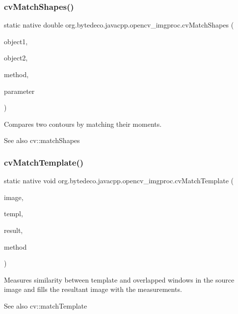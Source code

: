\subsubsection{\texorpdfstring{cv\+Match\+Shapes()}{cvMatchShapes()}}
{\footnotesize\ttfamily static native double org.\+bytedeco.\+javacpp.\+opencv\+\_\+imgproc.\+cv\+Match\+Shapes (\begin{DoxyParamCaption}\item[{@Const Pointer}]{object1,  }\item[{@Const Pointer}]{object2,  }\item[{int}]{method,  }\item[{double}]{parameter }\end{DoxyParamCaption})\hspace{0.3cm}{\ttfamily [static]}}



Compares two contours by matching their moments. 

\begin{DoxySeeAlso}{See also}
cv\+::match\+Shapes 
\end{DoxySeeAlso}
\mbox{\label{group__imgproc__c_ga6dda3f1745d471681378d2515509372a}} 
\subsubsection{\texorpdfstring{cv\+Match\+Template()}{cvMatchTemplate()}}
{\footnotesize\ttfamily static native void org.\+bytedeco.\+javacpp.\+opencv\+\_\+imgproc.\+cv\+Match\+Template (\begin{DoxyParamCaption}\item[{@Const Cv\+Arr}]{image,  }\item[{@Const Cv\+Arr}]{templ,  }\item[{Cv\+Arr}]{result,  }\item[{int}]{method }\end{DoxyParamCaption})\hspace{0.3cm}{\ttfamily [static]}}



Measures similarity between template and overlapped windows in the source image and fills the resultant image with the measurements. 

\begin{DoxySeeAlso}{See also}
cv\+::match\+Template 
\end{DoxySeeAlso}
\mbox{\label{group__imgproc__c_ga4c0de18f88f591ddd8e7c21559b28813}} 
